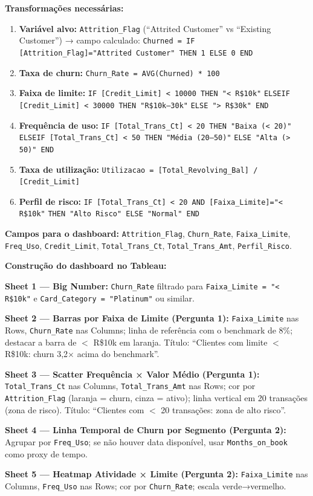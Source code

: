 \begin{SolvedBox}
\textbf{Transformações necessárias:}

\begin{enumerate}
  \item \textbf{Variável alvo:} \texttt{Attrition\_Flag} (``Attrited Customer'' vs
  ``Existing Customer'') → campo calculado:
  \texttt{Churned = IF [Attrition\_Flag]="Attrited Customer" THEN 1 ELSE 0 END}
  \item \textbf{Taxa de churn:} \texttt{Churn\_Rate = AVG(Churned) * 100}
  \item \textbf{Faixa de limite:}
  \texttt{IF [Credit\_Limit] < 10000 THEN "< R\$10k"}
  \texttt{ELSEIF [Credit\_Limit] < 30000 THEN "R\$10k–30k"}
  \texttt{ELSE "> R\$30k" END}
  \item \textbf{Frequência de uso:}
  \texttt{IF [Total\_Trans\_Ct] < 20 THEN "Baixa (< 20)"}
  \texttt{ELSEIF [Total\_Trans\_Ct] < 50 THEN "Média (20–50)"}
  \texttt{ELSE "Alta (> 50)" END}
  \item \textbf{Taxa de utilização:}
  \texttt{Utilizacao = [Total\_Revolving\_Bal] / [Credit\_Limit]}
  \item \textbf{Perfil de risco:}
  \texttt{IF [Total\_Trans\_Ct] < 20 AND [Faixa\_Limite]="< R\$10k"}
  \texttt{THEN "Alto Risco" ELSE "Normal" END}
\end{enumerate}

\textbf{Campos para o dashboard:} \texttt{Attrition\_Flag}, \texttt{Churn\_Rate},
\texttt{Faixa\_Limite}, \texttt{Freq\_Uso}, \texttt{Credit\_Limit},
\texttt{Total\_Trans\_Ct}, \texttt{Total\_Trans\_Amt}, \texttt{Perfil\_Risco}.
\end{SolvedBox}

\begin{SolvedBox}
\textbf{Construção do dashboard no Tableau:}

\textbf{Sheet 1 — Big Number:} \texttt{Churn\_Rate} filtrado para
\texttt{Faixa\_Limite = "< R\$10k"} e \texttt{Card\_Category = "Platinum"} ou similar.

\textbf{Sheet 2 — Barras por Faixa de Limite (Pergunta 1):}
\texttt{Faixa\_Limite} nas Rows, \texttt{Churn\_Rate} nas Columns;
linha de referência com o benchmark de 8\%;
destacar a barra de $<$ R\$10k em laranja.
Título: ``Clientes com limite $<$ R\$10k: churn 3,2$\times$ acima do benchmark''.

\textbf{Sheet 3 — Scatter Frequência × Valor Médio (Pergunta 1):}
\texttt{Total\_Trans\_Ct} nas Columns, \texttt{Total\_Trans\_Amt} nas Rows;
cor por \texttt{Attrition\_Flag} (laranja = churn, cinza = ativo);
linha vertical em 20 transações (zona de risco).
Título: ``Clientes com $<$ 20 transações: zona de alto risco''.

\textbf{Sheet 4 — Linha Temporal de Churn por Segmento (Pergunta 2):}
Agrupar por \texttt{Freq\_Uso}; se não houver data disponível, usar
\texttt{Months\_on\_book} como proxy de tempo.

\textbf{Sheet 5 — Heatmap Atividade × Limite (Pergunta 2):}
\texttt{Faixa\_Limite} nas Columns, \texttt{Freq\_Uso} nas Rows;
cor por \texttt{Churn\_Rate}; escala verde→vermelho.
\end{SolvedBox}


